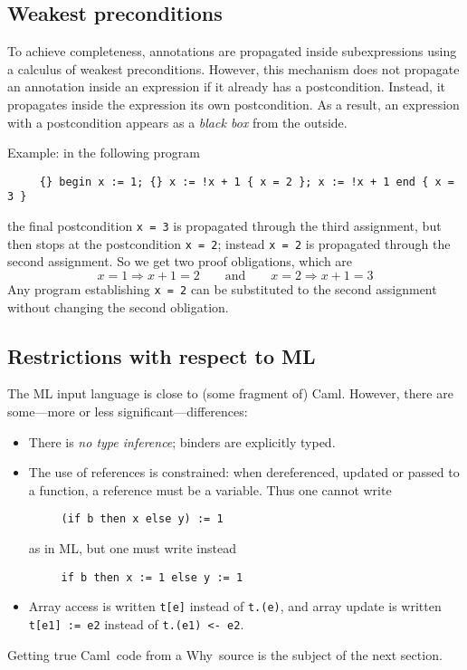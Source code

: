 \documentclass[a4paper,12pt]{report}
\newcommand{\caml}{\textsf{Caml}}
\newcommand{\why}{\textsf{Why}}
\begin{document}
\subsection{Weakest preconditions}
\label{wp}
To achieve completeness, annotations are propagated inside
subexpressions using a calculus of weakest preconditions.
However, this mechanism does not propagate an annotation inside an
expression if it already has a postcondition. Instead, it propagates
inside the expression its own postcondition. As a result, an
expression with a postcondition appears as a \emph{black box} from the
outside. 

Example: in the following program
\begin{verbatim}
     {} begin x := 1; {} x := !x + 1 { x = 2 }; x := !x + 1 end { x = 3 }
\end{verbatim}
the final postcondition \texttt{x = 3} is propagated through the third
assignment, but then stops at the postcondition \texttt{x = 2};
instead \texttt{x = 2} is propagated through the second
assignment. So we get two proof obligations, which are
\begin{displaymath}
  x=1 \Rightarrow x+1=2 
  \qquad\mbox{and}\qquad
  x=2 \Rightarrow x+1=3
\end{displaymath}
Any program establishing \texttt{x = 2} can be substituted to the
second assignment without changing the second obligation.


\subsection{Restrictions with respect to ML}
The ML input language is close to (some fragment of) \caml. However,
there are some---more or less significant---differences:
\begin{itemize}
\item There is \textit{no type inference}; binders are explicitly
  typed. 
\item The use of references is constrained: when dereferenced, updated
  or passed to a function, a reference must be a variable. Thus one
  cannot write
\begin{verbatim}
     (if b then x else y) := 1
\end{verbatim}
as in ML, but one must write instead
\begin{verbatim}
     if b then x := 1 else y := 1
\end{verbatim}
\item Array access is written \texttt{t[e]} instead of \texttt{t.(e)},
  and array update is written \texttt{t[e1] := e2} instead of
  \texttt{t.(e1) <- e2}.
\end{itemize}
Getting true \caml\ code from a \why\ source is the subject of the
next section.
\end{document}
